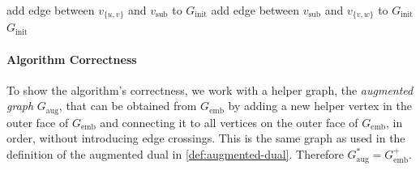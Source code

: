 \begin{algorithm}[H]
{    add edge between $v_{\{u,v\}}$ and $v_\text{sub}$ to $G_\text{init}$\;
    add edge between $v_\text{sub}$ and $v_{\{v,w\}}$ to $G_\text{init}$\;
    \label{line:transformation-loop3-end}
  }
  \Return $G_\text{init}$
\end{algorithm}
\vfill



\paragraph{Algorithm Correctness}

To show the algorithm's correctness, we work with a helper graph, the \emph{augmented graph} $G_\text{aug}$, that can be obtained from $G_\text{emb}$ by adding a new helper vertex in the outer face of $G_\text{emb}$ and connecting it to all vertices on the outer face of $G_\text{emb}$, in order, without introducing edge crossings. This is the same graph as used in the definition of the augmented dual in \cref{def:augmented-dual}. Therefore $G_\text{aug}^* = G_\text{emb}^+$.

